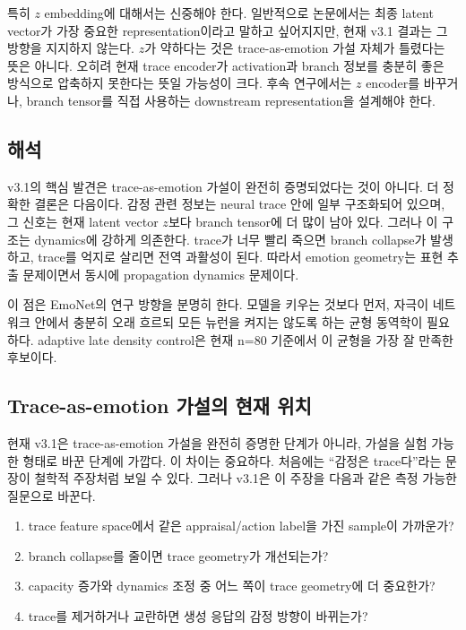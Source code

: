 \documentclass[11pt,a4paper]{article}
\begin{document}
특히 \(z\) embedding에 대해서는 신중해야 한다. 일반적으로 논문에서는 최종 latent vector가 가장 중요한 representation이라고 말하고 싶어지지만, 현재 v3.1 결과는 그 방향을 지지하지 않는다. \(z\)가 약하다는 것은 trace-as-emotion 가설 자체가 틀렸다는 뜻은 아니다. 오히려 현재 trace encoder가 activation과 branch 정보를 충분히 좋은 방식으로 압축하지 못한다는 뜻일 가능성이 크다. 후속 연구에서는 \(z\) encoder를 바꾸거나, branch tensor를 직접 사용하는 downstream representation을 설계해야 한다.

\subsection{해석}

v3.1의 핵심 발견은 trace-as-emotion 가설이 완전히 증명되었다는 것이 아니다. 더 정확한 결론은 다음이다. 감정 관련 정보는 neural trace 안에 일부 구조화되어 있으며, 그 신호는 현재 latent vector \(z\)보다 branch tensor에 더 많이 남아 있다. 그러나 이 구조는 dynamics에 강하게 의존한다. trace가 너무 빨리 죽으면 branch collapse가 발생하고, trace를 억지로 살리면 전역 과활성이 된다. 따라서 emotion geometry는 표현 추출 문제이면서 동시에 propagation dynamics 문제이다.

이 점은 EmoNet의 연구 방향을 분명히 한다. 모델을 키우는 것보다 먼저, 자극이 네트워크 안에서 충분히 오래 흐르되 모든 뉴런을 켜지는 않도록 하는 균형 동역학이 필요하다. adaptive late density control은 현재 n=80 기준에서 이 균형을 가장 잘 만족한 후보이다.

\subsection{Trace-as-emotion 가설의 현재 위치}

현재 v3.1은 trace-as-emotion 가설을 완전히 증명한 단계가 아니라, 가설을 실험 가능한 형태로 바꾼 단계에 가깝다. 이 차이는 중요하다. 처음에는 ``감정은 trace다''라는 문장이 철학적 주장처럼 보일 수 있다. 그러나 v3.1은 이 주장을 다음과 같은 측정 가능한 질문으로 바꾼다.

\begin{enumerate}
  \item trace feature space에서 같은 appraisal/action label을 가진 sample이 가까운가?
  \item branch collapse를 줄이면 trace geometry가 개선되는가?
  \item capacity 증가와 dynamics 조정 중 어느 쪽이 trace geometry에 더 중요한가?
  \item trace를 제거하거나 교란하면 생성 응답의 감정 방향이 바뀌는가?
\end{enumerate}
\end{document}
